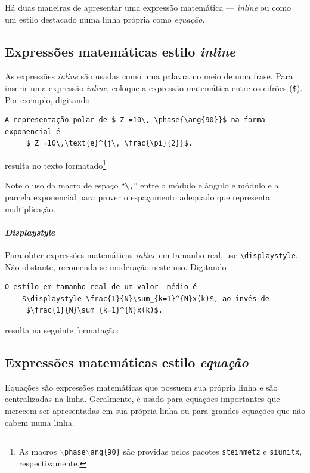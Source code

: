 Há duas maneiras de apresentar uma expressão matemática --- \emph{inline} ou como um estilo destacado numa linha própria como \emph{equação}.

\subsection{Expressões matemáticas estilo \emph{inline}}
As expressões \emph{inline} são usadas como uma palavra no meio de uma frase. Para inserir uma expressão \emph{inline}, coloque a expressão matemática entre os cifrões (\verb|$|). Por exemplo, digitando 

\begin{lstlisting}[language={[Latex]Tex},frame=single,numbers =none]
	A representação polar de $ Z =10\, \phase{\ang{90}}$ na forma exponencial é
	 $ Z =10\,\text{e}^{j\, \frac{\pi}{2}}$.
\end{lstlisting}
resulta no texto formatado\footnote{As macros \texttt{$\backslash$phase{$\backslash$ang\{90\}}} são providas pelos pacotes \texttt{steinmetz} e \texttt{siunitx}, respectivamente.}



Note o uso da macro de espaço ``\verb|\,|'' entre o módulo e ângulo e módulo e a parcela exponencial para prover o espaçamento adequado que representa multiplicação.


\paragraph{\emph{Displaystyle}} Para obter expressões matemáticas \emph{inline} em tamanho real, use \verb|\displaystyle|. Não obstante, recomenda-se moderação neste uso. Digitando 

\begin{lstlisting}[language={[Latex]Tex},frame=single,numbers =none]
	O estilo em tamanho real de um valor  médio é  
	$\displaystyle \frac{1}{N}\sum_{k=1}^{N}x(k)$, ao invés de 
	 $\frac{1}{N}\sum_{k=1}^{N}x(k)$.
\end{lstlisting} 

resulta na seguinte formatação:
 

\subsection{Expressões matemáticas estilo \emph{equação}}
Equações são expressões matemáticas que possuem sua própria linha e são centralizadas na linha. Geralmente,  é usado para equações importantes que merecem ser apresentadas em sua própria linha ou para grandes equações que não cabem numa linha. 

